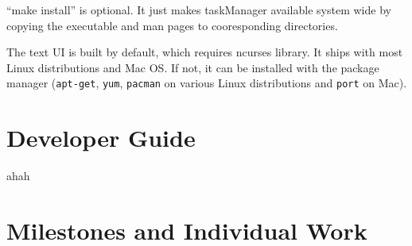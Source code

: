\documentclass[12pt, a4paper]{article}
\begin{document}
``make install'' is optional. It just makes taskManager available system wide by copying the executable and man pages to cooresponding directories.

The text UI is built by default, which requires ncurses library.
It ships with most Linux distributions and Mac OS. If not, it can be installed with the package manager (\texttt{apt-get}, \texttt{yum}, \texttt{pacman} on various Linux distributions and \texttt{port} on Mac).

\section{Developer Guide}
ahah

\section{Milestones and Individual Work}
\end{document}
